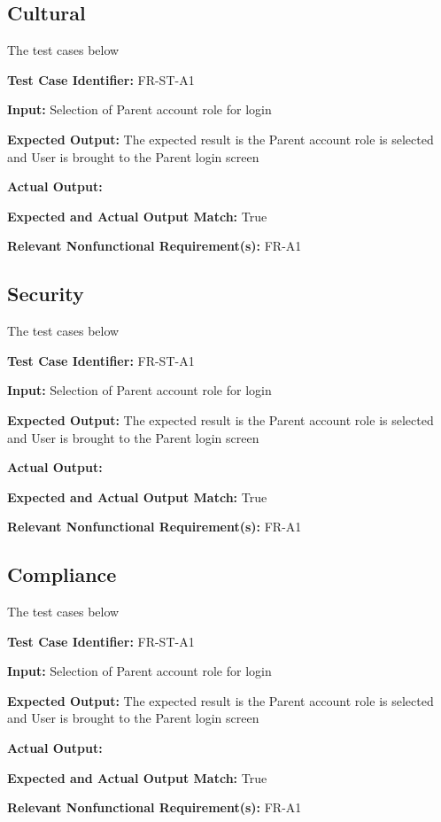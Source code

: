 \documentclass[12pt, titlepage]{article}
\begin{document}
\subsection{Cultural}
\hspace{2em}The test cases below 

\begin{mdframed}[linewidth=0.5mm] \par
  \textbf{Test Case Identifier:} FR-ST-A1 \par
  \textbf{Input:} Selection of Parent account role for login \par
  \textbf{Expected Output:} The expected result is the Parent account role is selected and User is brought to the Parent login screen \par
  \textbf{Actual Output:} \par
  \textbf{Expected and Actual Output Match:} True \par
  \textbf{Relevant Nonfunctional Requirement(s):} FR-A1
\end{mdframed}

\subsection{Security}
\hspace{2em}The test cases below 

\begin{mdframed}[linewidth=0.5mm] \par
  \textbf{Test Case Identifier:} FR-ST-A1 \par
  \textbf{Input:} Selection of Parent account role for login \par
  \textbf{Expected Output:} The expected result is the Parent account role is selected and User is brought to the Parent login screen \par
  \textbf{Actual Output:} \par
  \textbf{Expected and Actual Output Match:} True \par
  \textbf{Relevant Nonfunctional Requirement(s):} FR-A1
\end{mdframed}

\subsection{Compliance}
\hspace{2em}The test cases below 

\begin{mdframed}[linewidth=0.5mm] \par
  \textbf{Test Case Identifier:} FR-ST-A1 \par
  \textbf{Input:} Selection of Parent account role for login \par
  \textbf{Expected Output:} The expected result is the Parent account role is selected and User is brought to the Parent login screen \par
  \textbf{Actual Output:} \par
  \textbf{Expected and Actual Output Match:} True \par
  \textbf{Relevant Nonfunctional Requirement(s):} FR-A1
\end{mdframed}
	
\end{document}
